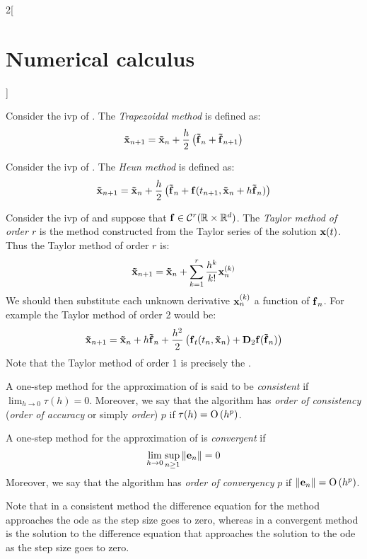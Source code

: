 \documentclass[../../../main_math.tex]{subfiles}
\begin{document}
\begin{multicols}{2}[\section{Numerical calculus}]
\begin{figure}[H]
    \label{NC:euler_fig}
  \end{figure}
  \begin{definition}
    Consider the ivp of . The \emph{Trapezoidal method} is defined as:
    $$\boldsymbol{\mathrm{\tilde{x}}}_{n+1}=\boldsymbol{\mathrm{\tilde{x}}}_{n}+\frac{h}{2}\left(\boldsymbol{\mathrm{\tilde{f}}}_n+\boldsymbol{\mathrm{\tilde{f}}}_{n+1}\right)$$
  \end{definition}
  \begin{definition}
    Consider the ivp of . The \emph{Heun method} is defined as:
    $$\boldsymbol{\mathrm{\tilde{x}}}_{n+1}=\boldsymbol{\mathrm{\tilde{x}}}_{n}+\frac{h}{2}\left(\boldsymbol{\mathrm{\tilde{f}}}_n+\boldsymbol{\mathrm{f}}(t_{n+1},\boldsymbol{\mathrm{\tilde{x}}}_{n}+h\boldsymbol{\mathrm{\tilde{f}}}_n)\right)$$
  \end{definition}
  \begin{definition}
    Consider the ivp of  and suppose that $\boldsymbol{\mathrm{f}}\in\mathcal{C}^r(\mathbb{R}\times\mathbb{R}^d)$. The \emph{Taylor method of order $r$} is the method constructed from the Taylor series of the solution $\boldsymbol{\mathrm{x}}(t)$. Thus the Taylor method of order $r$ is:
    $$\boldsymbol{\mathrm{\tilde{x}}}_{n+1}=\boldsymbol{\mathrm{\tilde{x}}}_{n}+\sum_{k=1}^r\frac{h^k}{k!}\boldsymbol{\mathrm{x}}_n^{(k)}$$
    We should then substitute each unknown derivative $\boldsymbol{\mathrm{x}}_n^{(k)}$ a function of $\boldsymbol{\mathrm{f}}_n$.
    For example the Taylor method of order 2 would be:
    $$\boldsymbol{\mathrm{\tilde{x}}}_{n+1}=\boldsymbol{\mathrm{\tilde{x}}}_{n}+h\boldsymbol{\mathrm{\tilde{f}}}_n+\frac{h^2}{2}\left(\boldsymbol{\mathrm{{f}}}_t(t_n,\boldsymbol{\mathrm{\tilde{x}}}_{n})+\boldsymbol{\mathrm{D}}_2\boldsymbol{\mathrm{f}}(\boldsymbol{\mathrm{\tilde{f}}}_n)\right)$$
    Note that the Taylor method of order 1 is precisely the .
  \end{definition}
  \begin{definition}
    A one-step method for the approximation of  is said to be \emph{consistent} if $\displaystyle\lim_{h\to 0}\tau(h)=0$. Moreover, we say that the algorithm has \emph{order of consistency} (\emph{order of accuracy} or simply \emph{order}) $p$ if $\tau(h)=\mathrm{O}\left(h^p\right)$.
  \end{definition}
  \begin{definition}
    A one-step method for the approximation of  is \emph{convergent} if $$\lim_{h\to 0}\sup_{n\geq 1}\left\|\boldsymbol{\mathrm{e}}_n\right\|=0$$
    Moreover, we say that the algorithm has \emph{order of convergency} $p$ if $\left\|\boldsymbol{\mathrm{e}}_n\right\|=\mathrm{O}\left(h^p\right)$.
  \end{definition}
  \begin{remark}
    Note that in a consistent method the difference equation for the method approaches the ode as the step size goes to zero, whereas in a convergent method is the solution to the difference equation that approaches the solution to the ode as the step size goes to zero.

\end{remark}
\end{multicols}
\end{document}

